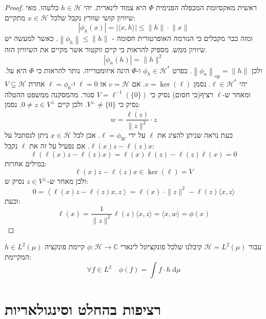 \documentclass{tstextbook}
\begin{document}
\begin{proof}
ראשית מאקסיומת המכפלה הפנימית \(\Phi\) היא צמוד לינארית. יהי \(h \in \mathcal{H}\) כלשהו. מאי שיוויון קושי שוורץ נקבל שלכל \(x \in \mathcal{H}\) מתקיים:
$$\left\lvert  \phi_{h}(x)  \right\rvert =\left\lvert  \langle x,h \rangle   \right\rvert \leq \lVert h \rVert \cdot \lVert x \rVert $$
ומזה כבר מקבלים כי הנורמה האופרטורית חסומה - \(\left\lVert  \phi_{h}  \right\rVert\leq \lVert h \rVert\). כאשר למעשה יש שיוויון ממש. מספיק להראות כי קיים ווקטור אשר מקיים את השיוויון הזה. 
$$\left\lvert  \phi_{n}(h)  \right\rvert =\lVert h \rVert ^{2}$$
ולכן \(\left\lVert  \phi_{n}  \right\rVert_{\mathrm{op}}=\lVert h \rVert\). בפרט \(\phi_{h}\in \mathcal{H}^{*}\) ו-\(\Phi\) הינה איזומטרייה. נותר להראות כי \(\Phi\) היא על. 
יהי \(\ell \in \mathcal{H}^{*}\). נסמן \(v=\ker\left( \ell \right)\). אם \(v = \mathcal{H}\) אז \(\ell=0\) ו-\(\ell=\phi_{0}\) אחרת \(V\subsetneq \mathcal{H}\) ומאחר ש-\(\ell\) רציף(כי חסום) נסיק כי \(V= \ell^{-1}\left( \{ 0 \} \right)\) סגור.
מהמסקנה ממשפט ההטלה נסיק כי \(V^{\perp}\neq \{ 0 \}\). ולכן קיים \(0\neq z \in V^{\perp}\). נסמן:
$$w=\frac{\overline{\ell(z)}}{\lVert z \rVert ^{2}}\cdot z $$
כעת נראה שניתן להציג את \(\ell\) על ידי \(\ell=\phi_{W}\). אכן לכל \(x \in \mathcal{H}\) ניתן לנסתכל על \(\ell(x)z-\ell(z)x\). אם נפעיל על זה את \(\ell\) נקבל:
$$\ell\left( \ell(x)z-\ell(z)x \right)=\ell(x)\ell(z)-\ell(z)\ell(x)=0$$
במילים אחרות:
$$\ell(x)z-\ell(z)x \in \ker \left( \ell \right)=V$$
ולכן מאחר ש-\(z \in V^{\perp}\) נסיק ש:
$$0=\left\langle  \ell(x)z-\ell(z)x,z  \right\rangle =\ell(x)\cdot \lVert z \rVert ^{2}-\ell(z)\langle x,z \rangle $$
וכעת:
$$\ell(x)= \frac{1}{\lVert z \rVert ^{2}}\ell(z)\langle x,z \rangle =\langle x,w \rangle =\phi(x)$$

\end{proof}
\begin{corollary}
עבור \(\mathcal{H}=L^{2}\left( \mu \right)\) קיבלנו שלכל פונקציונל לינארי \(\phi:\mathcal{H}\to \mathbb{C}\)  קיימת פונקציה \(h \in L^{2}\left( \mu \right)\) המקיימת:
$$\forall f \in L^{2}\quad \phi(f)=\int f\cdot h \;\mathrm{d} \mu $$

\end{corollary}
\section{רציפות בהחלט וסינגולאריות}
\end{document}
